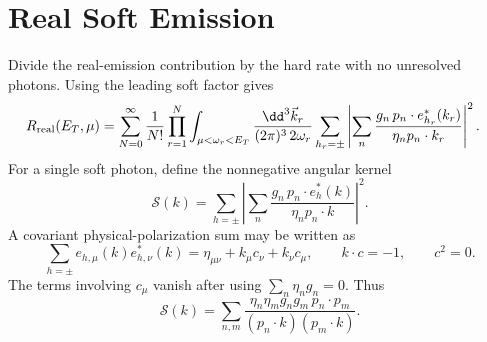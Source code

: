 \section{Real Soft Emission}

Divide the real-emission contribution by the hard rate with no unresolved
photons.  Using the leading soft factor gives
\[
\begin{aligned}
  R_{\rm real}(E_T,\mu)
  &=
  \sum_{N=0}^{\infty}\frac1{N!}
  \prod_{r=1}^{N}
  \int_{\mu<\omega_r<E_T}
  \frac{\dd^3\vec k_r}{(2\pi)^3\,2\omega_r}
  \sum_{h_r=\pm}
  \left|
    \sum_n
    \frac{g_n\,p_n\cdot e_{h_r}^*(k_r)}
         {\eta_n p_n\cdot k_r}
  \right|^2 .
\end{aligned}
\]
For a single soft photon, define the nonnegative angular kernel
\[
  \mathcal S(k)
  =
  \sum_{h=\pm}
  \left|
    \sum_n
    \frac{g_n\,p_n\cdot e_h^*(k)}
         {\eta_n p_n\cdot k}
  \right|^2 .
\]
A covariant physical-polarization sum may be written as
\[
  \sum_{h=\pm}e_{h,\mu}(k)e^*_{h,\nu}(k)
  =
  \eta_{\mu\nu}+k_\mu c_\nu+k_\nu c_\mu,
  \qquad
  k\cdot c=-1,\qquad c^2=0 .
\]
The terms involving \(c_\mu\) vanish after using
\(\sum_n\eta_n g_n=0\).  Thus
\[
  \mathcal S(k)
  =
  \sum_{n,m}
  \frac{\eta_n\eta_m g_ng_m\,p_n\cdot p_m}
       {(p_n\cdot k)(p_m\cdot k)} .
\]

